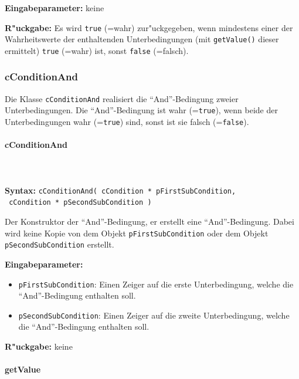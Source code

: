 \bigskip\noindent
\textbf{Eingabeparameter:} keine

\bigskip\noindent
\textbf{R"uckgabe:} Es wird \verb|true| (=wahr) zur"uckgegeben, wenn mindestens einer der Wahrheitswerte der enthaltenden Unterbedingungen (mit \verb|getValue()| dieser ermittelt) \verb|true| (=wahr) ist, sonst \verb|false| (=falsch).


\subsubsection{cConditionAnd}

Die Klasse \verb|cConditionAnd| realisiert die ``And''-Bedingung zweier Unterbedingungen. Die ``And''-Bedingung ist wahr (=\verb|true|), wenn beide der Unterbedingungen wahr (=\verb|true|) sind, sonst ist sie falsch  (=\verb|false|).

\paragraph{cConditionAnd}

\ \\\\\noindent
\textbf{Syntax:} \verb|cConditionAnd( cCondition * pFirstSubCondition,| \\\verb| cCondition * pSecondSubCondition )|

\bigskip\noindent
Der Konstruktor der ``And''-Bedingung, er erstellt eine ``And''-Bedingung. Dabei wird keine Kopie von dem Objekt \verb|pFirstSubCondition| oder dem Objekt \verb|pSecondSubCondition| erstellt.

\bigskip\noindent
\textbf{Eingabeparameter:}
\begin{itemize}
 \item \verb|pFirstSubCondition|: Einen Zeiger auf die erste Unterbedingung, welche die ``And''-Bedingung enthalten soll.
 \item \verb|pSecondSubCondition|: Einen Zeiger auf die zweite Unterbedingung, welche die ``And''-Bedingung enthalten soll.
\end{itemize}

\bigskip\noindent
\textbf{R"uckgabe:} keine


\paragraph{getValue}

